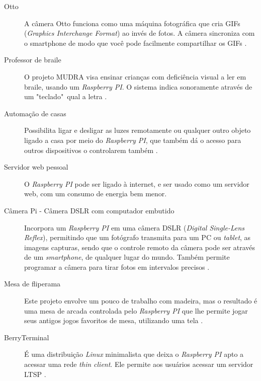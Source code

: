 \documentclass[
	12pt,				%
	openright,			%
	twoside,			%
	a4paper,			%
	chapter=TITLE,		%
	english,			%
	brazil				%
	]{abntex2}
\begin{document}
\begin{description}

\item[Otto]A câmera Otto funciona como uma máquina fotográfica que cria GIFs (\textit{Graphics Interchange Format}) ao invés de fotos. A câmera sincroniza com o smartphone de modo que você pode facilmente compartilhar os GIFs \cite{otto}.
  
\item[Professor de braile] O projeto MUDRA visa ensinar crianças com deficiência visual a ler em braile, usando um \textit{Raspberry PI}. O sistema indica sonoramente através de um "teclado"\ qual a  letra \cite{mudra}.

\item[Automação de casas] Possibilita ligar e desligar as luzes remotamente ou qualquer outro objeto ligado a casa por meio do \textit{Raspberry PI}, que também dá o acesso para outros dispositivos o controlarem também \cite{AplicacaoRaspberry}.

\item[Servidor web pessoal] O \textit{Raspberry PI} pode ser ligado à internet, e ser usado como um servidor web, com um consumo de energia bem menor.


\item[Câmera Pi - Câmera  DSLR com computador embutido] Incorpora um \textit{Raspberry PI} em uma câmera DSLR (\textit{Digital Single-Lens Reflex}), permitindo que um fotógrafo transmita para um PC ou \textit{tablet}, as imagens capturas, sendo que o controle remoto da câmera pode ser através de um \textit{smartphone}, de qualquer lugar do mundo. Também permite programar a câmera para tirar fotos em intervalos precisos \cite{cameraPI}.

\item[Mesa de fliperama] Este projeto envolve um pouco de trabalho com madeira, mas o resultado é uma mesa de arcada controlada pelo \textit{Raspberry PI} que lhe permite jogar seus antigos jogos favoritos de mesa, utilizando uma tela \cite{AplicacaoRaspberry}.

\item[BerryTerminal] É uma distribuição \textit{Linux} minimalista que deixa o \textit{Raspberry PI} apto a acessar uma rede \textit{thin client}. Ele permite aos usuários acessar um servidor LTSP \cite{berryterminal}.

\end{description}


\end{document}
